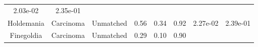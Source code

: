 \documentclass[12pt,]{article}
\begin{document}
\begin{longtable}[]{@{}cccccccc@{}}
\begin{minipage}[t]{0.06\columnwidth}
2.03e-02\strut
\end{minipage} & \begin{minipage}[t]{0.06\columnwidth}\centering\strut
2.35e-01\strut
\end{minipage}\tabularnewline
\begin{minipage}[t]{0.19\columnwidth}\centering\strut
Holdemania\strut
\end{minipage} & \begin{minipage}[t]{0.07\columnwidth}\centering\strut
Carcinoma\strut
\end{minipage} & \begin{minipage}[t]{0.09\columnwidth}\centering\strut
Unmatched\strut
\end{minipage} & \begin{minipage}[t]{0.03\columnwidth}\centering\strut
0.56\strut
\end{minipage} & \begin{minipage}[t]{0.14\columnwidth}\centering\strut
0.34\strut
\end{minipage} & \begin{minipage}[t]{0.14\columnwidth}\centering\strut
0.92\strut
\end{minipage} & \begin{minipage}[t]{0.06\columnwidth}\centering\strut
2.27e-02\strut
\end{minipage} & \begin{minipage}[t]{0.06\columnwidth}\centering\strut
2.39e-01\strut
\end{minipage}\tabularnewline
\begin{minipage}[t]{0.19\columnwidth}\centering\strut
Finegoldia\strut
\end{minipage} & \begin{minipage}[t]{0.07\columnwidth}\centering\strut
Carcinoma\strut
\end{minipage} & \begin{minipage}[t]{0.09\columnwidth}\centering\strut
Unmatched\strut
\end{minipage} & \begin{minipage}[t]{0.03\columnwidth}\centering\strut
0.29\strut
\end{minipage} & \begin{minipage}[t]{0.14\columnwidth}\centering\strut
0.10\strut
\end{minipage} & \begin{minipage}[t]{0.14\columnwidth}\centering\strut
0.90\strut
\end{minipage} & \begin{minipage}[t]{0.06\columnwidth}\centering\strut

\end{minipage}
\end{longtable}
\end{document}
